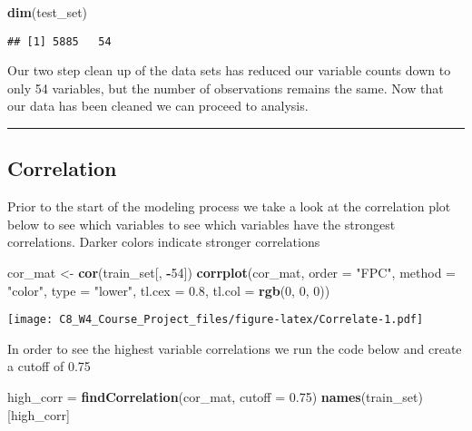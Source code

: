 \documentclass[]{article}
\newenvironment{Shaded}{\begin{snugshade}}{\end{snugshade}}
\newcommand{\KeywordTok}[1]{\textcolor[rgb]{0.13,0.29,0.53}{\textbf{#1}}}
\newcommand{\DataTypeTok}[1]{\textcolor[rgb]{0.13,0.29,0.53}{#1}}
\newcommand{\DecValTok}[1]{\textcolor[rgb]{0.00,0.00,0.81}{#1}}
\newcommand{\FloatTok}[1]{\textcolor[rgb]{0.00,0.00,0.81}{#1}}
\newcommand{\StringTok}[1]{\textcolor[rgb]{0.31,0.60,0.02}{#1}}
\newcommand{\OperatorTok}[1]{\textcolor[rgb]{0.81,0.36,0.00}{\textbf{#1}}}
\newcommand{\NormalTok}[1]{#1}
\begin{document}
\begin{Shaded}
\begin{Highlighting}[]
\KeywordTok{dim}\NormalTok{(test_set)}
\end{Highlighting}
\end{Shaded}

\begin{verbatim}
## [1] 5885   54
\end{verbatim}

Our two step clean up of the data sets has reduced our variable counts
down to only 54 variables, but the number of observations remains the
same. Now that our data has been cleaned we can proceed to analysis.

\begin{center}\rule{0.5\linewidth}{\linethickness}\end{center}

\subsection{Correlation}\label{correlation}

Prior to the start of the modeling process we take a look at the
correlation plot below to see which variables to see which variables
have the strongest correlations. Darker colors indicate stronger
correlations

\begin{Shaded}
\begin{Highlighting}[]
\NormalTok{cor_mat <-}\StringTok{ }\KeywordTok{cor}\NormalTok{(train_set[, }\OperatorTok{-}\DecValTok{54}\NormalTok{])}
\KeywordTok{corrplot}\NormalTok{(cor_mat, }\DataTypeTok{order =} \StringTok{"FPC"}\NormalTok{, }\DataTypeTok{method =} \StringTok{"color"}\NormalTok{, }\DataTypeTok{type =} \StringTok{"lower"}\NormalTok{, }\DataTypeTok{tl.cex =} \FloatTok{0.8}\NormalTok{, }\DataTypeTok{tl.col =} \KeywordTok{rgb}\NormalTok{(}\DecValTok{0}\NormalTok{, }\DecValTok{0}\NormalTok{, }\DecValTok{0}\NormalTok{))}
\end{Highlighting}
\end{Shaded}

\texttt{[image: C8\_W4\_Course\_Project\_files/figure-latex/Correlate-1.pdf]}

In order to see the highest variable correlations we run the code below
and create a cutoff of 0.75

\begin{Shaded}
\begin{Highlighting}[]
\NormalTok{high_corr =}\StringTok{ }\KeywordTok{findCorrelation}\NormalTok{(cor_mat, }\DataTypeTok{cutoff =} \FloatTok{0.75}\NormalTok{)}
\KeywordTok{names}\NormalTok{(train_set)[high_corr]}
\end{Highlighting}
\end{Shaded}
\end{document}
